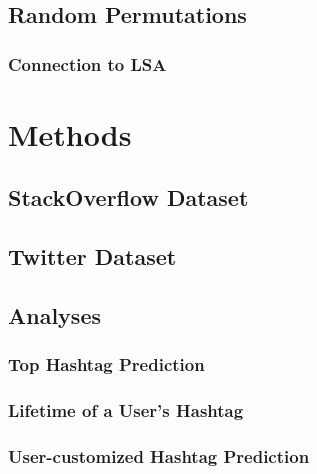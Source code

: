 \documentclass[man]{apa6}
\begin{document}
\subsection{Random Permutations}

\subsubsection{Connection to LSA}

\section{Methods}

\subsection{StackOverflow Dataset}

\subsection{Twitter Dataset}

\subsection{Analyses}

\subsubsection{Top Hashtag Prediction}

\subsubsection{Lifetime of a User's Hashtag}

\subsubsection{User-customized Hashtag Prediction}

\printbibliography
\end{document}
